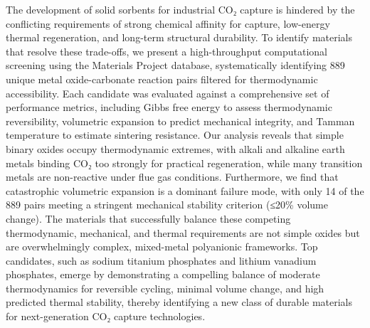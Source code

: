 \documentclass[]{article}
\begin{document}
The development of solid sorbents for industrial CO₂ capture is hindered by the conflicting requirements of strong chemical affinity for capture, low-energy thermal regeneration, and long-term structural durability. To identify materials that resolve these trade-offs, we present a high-throughput computational screening using the Materials Project database, systematically identifying 889 unique metal oxide-carbonate reaction pairs filtered for thermodynamic accessibility. Each candidate was evaluated against a comprehensive set of performance metrics, including Gibbs free energy to assess thermodynamic reversibility, volumetric expansion to predict mechanical integrity, and Tamman temperature to estimate sintering resistance. Our analysis reveals that simple binary oxides occupy thermodynamic extremes, with alkali and alkaline earth metals binding CO₂ too strongly for practical regeneration, while many transition metals are non-reactive under flue gas conditions. Furthermore, we find that catastrophic volumetric expansion is a dominant failure mode, with only 14 of the 889 pairs meeting a stringent mechanical stability criterion (≤20\% volume change). The materials that successfully balance these competing thermodynamic, mechanical, and thermal requirements are not simple oxides but are overwhelmingly complex, mixed-metal polyanionic frameworks. Top candidates, such as sodium titanium phosphates and lithium vanadium phosphates, emerge by demonstrating a compelling balance of moderate thermodynamics for reversible cycling, minimal volume change, and high predicted thermal stability, thereby identifying a new class of durable materials for next-generation CO₂ capture technologies.
\end{document}
